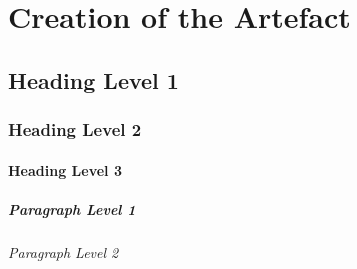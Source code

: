 \cleardoublepage
\chapter{Creation of the Artefact}
\label{chap:3}

\section{Heading Level 1}

\subsection{Heading Level 2}

\subsubsection{Heading Level 3}

\paragraph{Paragraph Level 1}

\subparagraph{Paragraph Level 2}
